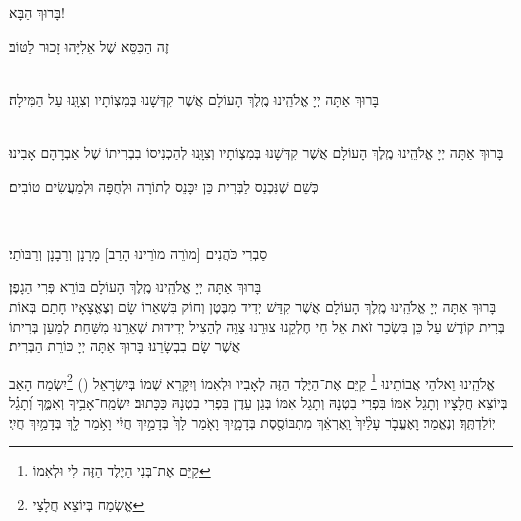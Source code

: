 \documentclass[twoside, openany, parskip=half, 11pt]{book}
\begin{document}
\begin{Large}
בָּרוּךְ הַבָּא!

\end{Large}

זֶה הַכִּסֵּא שֶׁל אֵלִיָּהוּ זָכוּר לַטּוֹב׃


\\
בָּרוּךְ אַתָּה יְיָ אֱלֹהֵֽינוּ מֶֽלֶךְ הָעוֹלָם אֲשֶׁר קִדְּשָׁנוּ בְּמִצְוֹתָיו וְצִוָּֽנוּ עַל הַמִּילָה׃

\\
בָּרוּךְ אַתָּה יְיָ אֱלֹהֵֽינוּ מֶֽלֶךְ הָעוֹלָם אֲשֶׁר קִדְּשָׁנוּ בְּמִצְוֹתָיו וְצִוָּֽנוּ לְהַכְנִיסוֹ בִבְרִיתוֹ שֶׁל אַבְרָהָם אָבִינוּ׃

\kahal
כְּשֵׁם שֶׁנִּכְנַס לַבְּרִית כֵּן יִכָּנֵס לְתוֹרָה וּלְחֻפָּה וּלְמַעֲשִׂים טוֹבִים׃

\\
\begin{footnotesize}
סַבְרִי כֹּהֲנִים [מוׂרֵה מוׂרֵינוּ הָרַב] מָרָנָן וְרַבָנָן וְרַבּוׂתַי׃\\
\end{footnotesize}
בָּרוּךְ אַתָּה יְיָ אֱלֹהֵֽינוּ מֶֽלֶךְ הָעוֹלָם בּוֹרֵא פְּרִי הַגָפֶן׃\\
בָּרוּךְ אַתָּה יְיָ אֱלֹהֵֽינוּ מֶֽלֶךְ הָעוֹלָם אֲשֶׁר קִדַּשׁ יְדִיד מִבֶּטֶן וְחוֹק בִּשְׁאֵרוֹ שָׂם וְצֶאֱצָאָיו חָתַם בְּאוֹת בְּרִית קוֹדֶשׁ עַל כֵּן בִּשְׂכַר זֹאת אֵל חַי חֶלְקֵנוּ צוּרֵנוּ צַוֵּה לְהַצִיל יְדִידוּת שְׁאֵרֵנוּ מִשַּׁחַת׃ לְמַעַן בְּרִיתוֹ אֲשֶׁר שָׂם בִבְשָׂרֵנוּ׃ בָּרוּךְ אַתָּה יְיָ כּוֹרֵת הַבְּרִית׃

אֱלֹהֵֽינוּ וֵאלֹהֵי אֲבוֹתֵינוּ \footnote{
קַיֵּם אֶת־בְּנִי הַיֶלֶד הַזֶּה לִי וּלְאִמוֹ} קַיֵּם אֶת־הַיֶּלֶד הַזֶּה לְאָבִיו וּלְאִמוֹ וְיִקָּרֵא שְׁמוֹ בְּיִשְׂרָאֵל () \footnote{
אֱשְׂמַח בְּיוֹצֵא חֲלָצַי}יִשְׂמַח הָאַב בְּיוֹצֵא חֲלָצָיו וְתָגֵל אִמּוֹ בִּפְרִי בִטְנָהּ וְתָגֵל אִמּוֹ בְּגַן עֵדֶן בִּפְרִי בִטְנָהּ
כַּכָּתוּב׃ יִשְׂמַֽח־אָבִ֥יךָ וְאִמֶּ֑ךָ וְ֝תָגֵ֗ל יֽוֹלַדְתֶּֽךָ׃
וְנֶאֱמַר׃ וָאֶעֱבֹ֤ר עָלַ֨יִךְ֙ וָֽאֶרְאֵ֔ךְ מִתְבּוֹסֶ֖סֶת בְּדָמָ֑יִךְ
וָאֹ֤מַר לָךְ֙ בְּדָמַ֣יִךְ חֲיִ֔י וָאֹ֥מַר לָ֖ךְ בְּדָמַ֥יִךְ חֲיִֽי׃
\end{document}
